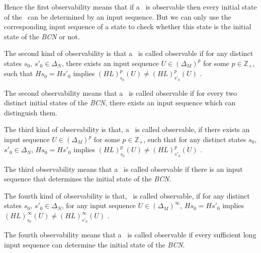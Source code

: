 Hence the first observability means that if a \BCN\ is observable then every initial state of the \BCN\ can be determined by an input sequence. But we can only use the corresponding input sequence of a state to check whether this state is the initial state of the {\em BCN} or not.
\begin{definition}
	The second kind of observability is that a \BCN\ is called observable if for any distinct states $s_0$, ${s'}_0 \in \Delta_N$, there exists an input sequence $U\in(\Delta_M)^p$ for some $p\in \mathbb{Z}_+$, such that $Hs_0=H{s'}_0$ implies $(HL)^p_{s_0}(U)\neq (HL)^p_{{s'}_0}(U)$ \cite{Zhao2010Input}.
\end{definition}

The second observability means that a \BCN\ is called observable if for every two distinct initial states of the {\em BCN}, there exists an input sequence which can distinguish them. 
\begin{definition}
	The third kind of observability is that, a \BCN\ is called observable, if there exists an input sequence $U\in(\Delta_M)^p$ for some $p\in \mathbb{Z}_+$, such that for any distinct states $s_0$, ${s'}_0 \in \Delta_N$, $Hs_0=H{s'}_0$ implies $(HL)^p_{s_0}(U)\neq (HL)^p_{{s'}_0}(U)$ \cite{Cheng2011Identification}.
\end{definition}

The third observability means that a \BCN\ is called observable if there is an input sequence that determines the initial state of the {\em BCN}.
\begin{definition}
	The fourth kind of observability is that, \BCN\ is called observable, if for any distinct states $s_0$, ${s'}_0 \in \Delta_N$, for any input sequence $U\in(\Delta_M)^{\infty}$, $Hs_0=H{s'}_0$ implies $(HL)^{\infty}_{s_0}(U)\neq (HL)^{\infty}_{{s'}_0}(U)$ \cite{Fornasini2013Observability}.
\end{definition}

The fourth observability means that a \BCN\ is called observable if every sufficient long input sequence can determine the initial state of the {\em BCN}.

